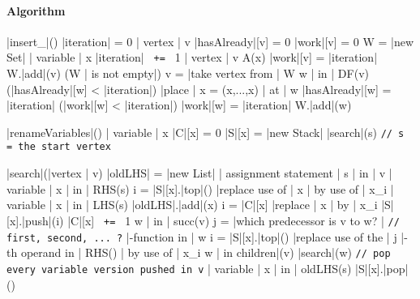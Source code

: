\documentclass[a4paper,12pt, notitlepage]{article}
\newcommand{\negv}{\vspace{-0.7cm}}
\begin{document}
\paragraph*{Algorithm}
\begin{program}
\PROC |insert_|\Phi() \BODY
    |iteration| = 0
    \FOREACH | vertex | v \DO
        |hasAlready|[v] = 0
        |work|[v] = 0
    \OD
    W = |new Set|
    \FOREACH | variable | x \DO
        |iteration| \texttt{ += } 1
        \FOREACH | vertex | v \in A(x) \DO
            |work|[v] = |iteration|
            W.|add|(v)
        \OD
        \WHILE (W | is not empty|) \DO 
            v = |take vertex from | W
            \FOREACH w | in | DF(v) \DO
                \IF (|hasAlready|[w] < |iteration|) \AR*
                    |place | x = \Phi(x,...,x) | at | w
                    |hasAlready|[w] = |iteration|
                    \IF (|work|[w] < |iteration|) \AR*
                        |work|[w] = |iteration|
                        W.|add|(w)
                    \FI
                \FI
            \OD
        \OD
    \OD
\end{program}
\negv
\begin{program}
\PROC |renameVariables|() \BODY
    \FOREACH | variable | x \DO
        |C|[x] = 0
        |S|[x] = |new Stack|
    \OD
    |search|(s) \hspace{1cm} \texttt{// s = the start vertex}
\end{program}
\pagebreak
\begin{program}
\PROC |search|(|vertex | v) \BODY
    |oldLHS| = |new List|
    \FOREACH | assignment statement | s | in | v \DO
        \FOREACH | variable | x | in | RHS(s) \DO
            i = |S|[x].|top|()
            |replace use of | x | by use of | x_i
        \OD
        \FOREACH | variable | x | in | LHS(s) \DO
            |oldLHS|.|add|(x)
            i = |C|[x]
            |replace | x | by | x_i
            |S|[x].|push|(i)
            |C|[x] \texttt{ += } 1
        \OD
    \OD
    \FOREACH w | in | succ(v) \DO
        j = |which predecessor is v to w? | \hspace{1cm} \texttt{// first, second, ... ?}
        \FOREACH \Phi|-function in | w \DO
            i = |S|[x].|top|()
            |replace use of the | j |-th operand in | RHS(\Phi) | by use of | x_i
        \OD
    \OD
    \FOREACH w | in children|(v) \DO
        |search|(w)
    \texttt{// pop every variable version pushed in v}
    \FOREACH | variable | x | in | oldLHS(s) \DO
        |S|[x].|pop|()
    \OD
\end{program}
\end{document}
